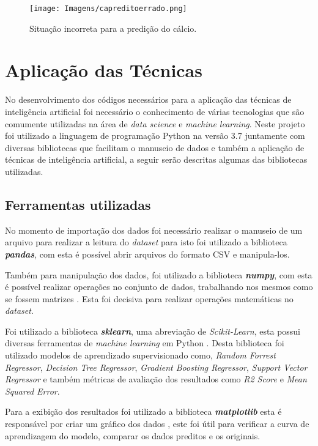 \documentclass[
12pt,				%
oneside,			%
a4paper,			%
english,			%
french,				%
spanish,			%
brazil				%
]{abntex2}
\begin{document}
\begin{figure}[H]
	\caption{Situação incorreta para a predição do cálcio.}
	\centering %
	\texttt{[image: Imagens/capreditoerrado.png]} %
	\label{figura:capreditoerrado}
\end{figure}


\section{Aplicação das Técnicas}

No desenvolvimento dos códigos necessários para a aplicação das técnicas de inteligência artificial foi necessário o conhecimento de várias tecnologias que são comumente utilizadas na área de \textit{data science} e \textit{machine learning}. Neste projeto foi utilizado a linguagem de programação Python na versão 3.7 juntamente com diversas bibliotecas que facilitam o manuseio de dados e também a aplicação de técnicas de inteligência artificial, a seguir serão descritas algumas das bibliotecas utilizadas. 

\subsection{Ferramentas utilizadas}

No momento de importação dos dados foi necessário realizar o manuseio de um arquivo para realizar a leitura do \textit{dataset} para isto foi utilizado a biblioteca \textbf{\textit{pandas}}, com esta é possível abrir arquivos do formato CSV e manipula-los\cite{mckinney2011pandas}.

Também para manipulação dos dados, foi utilizado a biblioteca \textbf{\textit{numpy}}, com esta é possível realizar operações no conjunto de dados, trabalhando nos mesmos como se fossem matrizes \cite{van2011numpy}. Esta foi decisiva para realizar operações matemáticas no \textit{dataset}. 

Foi utilizado a biblioteca \textit{\textbf{sklearn}}, uma abreviação de \textit{Scikit-Learn}, esta possui diversas ferramentas de \textit{machine learning} em Python \cite{pedregosa2011scikit}. Desta biblioteca foi utilizado modelos de aprendizado supervisionado como, \textit{Random Forrest Regressor}, \textit{Decision Tree Regressor}, \textit{Gradient Boosting Regressor}, \textit{Support Vector Regressor} e também métricas de avaliação dos resultados como \textit{R2 Score} e \textit{Mean Squared Error}.

Para a exibição dos resultados foi utilizado a biblioteca \textbf{\textit{matplotlib}} esta é responsável por criar um gráfico dos dados \cite{hunter2007matplotlib}, este foi útil para verificar a curva de aprendizagem do modelo, comparar os dados preditos e os originais.
\end{document}
